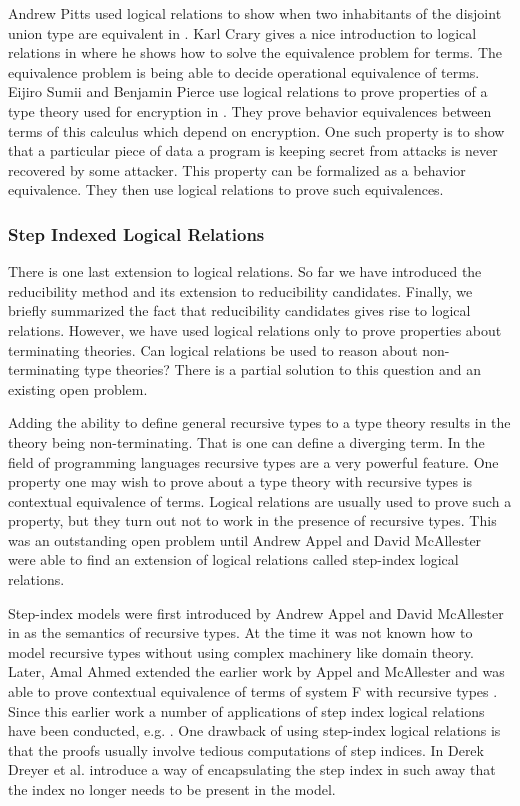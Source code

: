 \documentclass{article}
\begin{document}
Andrew Pitts used logical relations to show when two inhabitants of
the disjoint union type are equivalent in \cite{Pitts:1998}.  Karl
Crary gives a nice introduction to logical relations in
\cite{Pierce:2004} where he shows how to solve the equivalence problem
for terms.  The equivalence problem is being able to decide
operational equivalence of terms.  Eijiro Sumii and Benjamin Pierce
use logical relations to prove properties of a type theory used for
encryption in \cite{Sumii:2003}.  They prove behavior equivalences
between terms of this calculus which depend on encryption.  One such
property is to show that a particular piece of data a program is
keeping secret from attacks is never recovered by some attacker.  This
property can be formalized as a behavior equivalence.  They then use
logical relations to prove such equivalences.

\subsubsection{Step Indexed Logical Relations}
\label{subsec:step_indexed_logical_relations}
There is one last extension to logical relations.  So far we have
introduced the reducibility method and its extension to reducibility
candidates.  Finally, we briefly summarized the fact that reducibility
candidates gives rise to logical relations.  However, we have used
logical relations only to prove properties about terminating theories.
Can logical relations be used to reason about non-terminating type
theories?  There is a partial solution to this question and an
existing open problem. 

Adding the ability to define general recursive types to a type theory
results in the theory being non-terminating.  That is one can define a
diverging term.  In the field of programming languages recursive
types are a very powerful feature.  One property one may wish to prove
about a type theory with recursive types is contextual equivalence of
terms.  Logical relations are usually used to prove such a property,
but they turn out not to work in the presence of recursive types.
This was an outstanding open problem until Andrew Appel and David
McAllester were able to find an extension of logical relations called
step-index logical relations.

Step-index models were first introduced by Andrew Appel and David
McAllester in \cite{Appel:2001} as the semantics of recursive types.
At the time it was not known how to model recursive types without
using complex machinery like domain theory.  Later, Amal Ahmed
extended the earlier work by Appel and McAllester and was able to
prove contextual equivalence of terms of system F with recursive types
\cite{Ahmed:2006}.  Since this earlier work a number of applications
of step index logical relations have been conducted, e.g.
\cite{Acar:2008,Ahmed:2009,Neis:2009,Vytiniotis:2009}.  One drawback
of using step-index logical relations is that the proofs usually
involve tedious computations of step indices.  In \cite{Dreyer:2010}
Derek Dreyer et al. introduce a way of encapsulating the step index in
such away that the index no longer needs to be present in the model.
\end{document}
